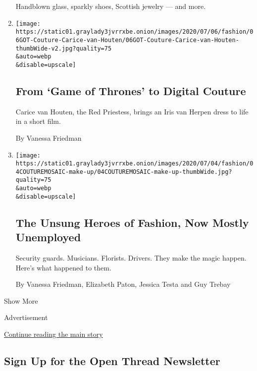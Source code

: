 \begin{enumerate}
  Handblown glass, sparkly shoes, Scottish jewelry --- and more.
\item
  \href{/2020/07/06/style/game-of-thrones-iris-van-herpen-couture.html}{}

  \texttt{[image: https://static01.graylady3jvrrxbe.onion/images/2020/07/06/fashion/06GOT-Couture-Carice-van-Houten/06GOT-Couture-Carice-van-Houten-thumbWide-v2.jpg?quality=75\\\&auto=webp\\\&disable=upscale]}

  \hypertarget{from-game-of-thrones-to-digital-couture}{%
  \subsection{From `Game of Thrones' to Digital
  Couture}\label{from-game-of-thrones-to-digital-couture}}

  Carice van Houten, the Red Priestess, brings an Iris van Herpen dress
  to life in a short film.

  By Vanessa Friedman
\item
  \href{/2020/07/04/style/couture-workers-fashion-coronavirus.html}{}

  \texttt{[image: https://static01.graylady3jvrrxbe.onion/images/2020/07/04/fashion/04COUTUREMOSAIC-make-up/04COUTUREMOSAIC-make-up-thumbWide.jpg?quality=75\\\&auto=webp\\\&disable=upscale]}

  \hypertarget{the-unsung-heroes-of-fashion-now-mostly-unemployed}{%
  \subsection{The Unsung Heroes of Fashion, Now Mostly
  Unemployed}\label{the-unsung-heroes-of-fashion-now-mostly-unemployed}}

  Security guards. Musicians. Florists. Drivers. They make the magic
  happen. Here's what happened to them.

  By Vanessa Friedman, Elizabeth Paton, Jessica Testa and Guy Trebay
\end{enumerate}

Show More

Advertisement

\protect\hyperlink{after-mid2}{Continue reading the main story}

\hypertarget{sign-up-for-the-open-thread-newsletter}{%
\subsection{Sign Up for the Open Thread
Newsletter}\label{sign-up-for-the-open-thread-newsletter}}

